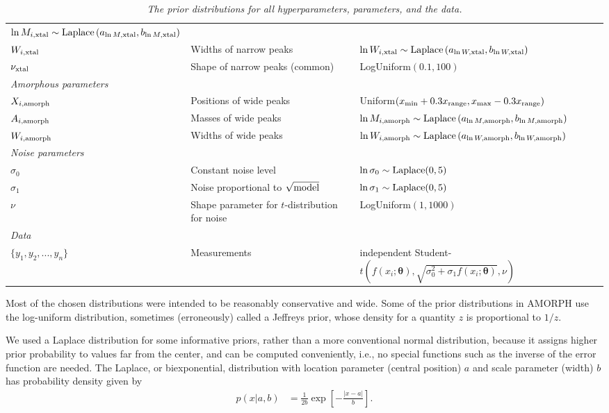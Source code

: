 \documentclass[review]{elsarticle}
\newcommand{\params}{\boldsymbol{\theta}}
\begin{document}
\begin{landscape}
\begin{table}
\begin{tabular}{|lll|}
 $\ln M_{i, \rm xtal} \sim \textnormal{Laplace}\left(a_{\ln M, \rm xtal}, b_{\ln M, \rm xtal}\right)$ \\
$W_{i, \rm xtal}$ & Widths of narrow peaks &
 $\ln W_{i, \rm xtal} \sim \textnormal{Laplace}\left(a_{\ln W, \rm xtal}, b_{\ln W, \rm xtal}\right)$ \\
$\nu_{\rm xtal}$ & Shape of narrow peaks (common) & LogUniform$(0.1, 100)$\\
\hline
{\em Amorphous parameters}&&\\
$X_{i, \rm amorph}$ & Positions of wide peaks &
          Uniform$(x_{\rm min}+0.3x_{\rm range}, x_{\rm max}-0.3x_{\rm range})$ \\
$A_{i, \rm amorph}$ & Masses of wide peaks &
 $\ln M_{i, \rm amorph} \sim \textnormal{Laplace}\left(a_{\ln M, \rm amorph}, b_{\ln M, \rm amorph}\right)$ \\
$W_{i, \rm amorph}$ & Widths of wide peaks &
 $\ln W_{i, \rm amorph} \sim \textnormal{Laplace}\left(a_{\ln W, \rm amorph}, b_{\ln W, \rm amorph}\right)$ \\
\hline
{\em Noise parameters}&&\\
$\sigma_0$ &    Constant noise level  &   $\ln \sigma_0 \sim \textnormal{Laplace}(0,5)$\\
$\sigma_1$ &    Noise proportional to $\sqrt{\textnormal{model}}$   &  $\ln \sigma_1 \sim \textnormal{Laplace}(0,5)$ \\
$\nu$     &   Shape parameter for $t$-distribution for noise   &   LogUniform$(1, 1000)$\\
\hline
{\em Data}&&\\
\hline
$\{y_1, y_2, ..., y_n\}$  &   Measurements    & independent Student-$t(f(x_i; \params), \sqrt{\sigma_0^2 + \sigma_1f(x_i; \params)},\nu)$\\
\hline
\end{tabular}
\caption{\it The prior distributions for all hyperparameters,
parameters, and the data.\label{tab:priors}}
\end{table}

\end{landscape}

Most of the chosen distributions were intended to be reasonably
conservative and wide.
Some of the prior distributions in AMORPH use the log-uniform distribution,
sometimes (erroneously) called a Jeffreys prior, whose density for a quantity
$z$ is proportional to $1/z$.

We used a Laplace distribution for some informative priors, rather than
a more conventional normal distribution, because it assigns higher
prior probability to values far from the center, and can be computed conveniently, i.e., no special functions such as the inverse of the
error function are needed.
The Laplace, or biexponential, distribution with location parameter
(central position) $a$ and scale parameter (width) $b$ has probability
density given by
\begin{align}
p(x | a, b) &= \frac{1}{2b}\exp\left[-\frac{|x - a|}{b}\right].
\end{align}
\end{document}
